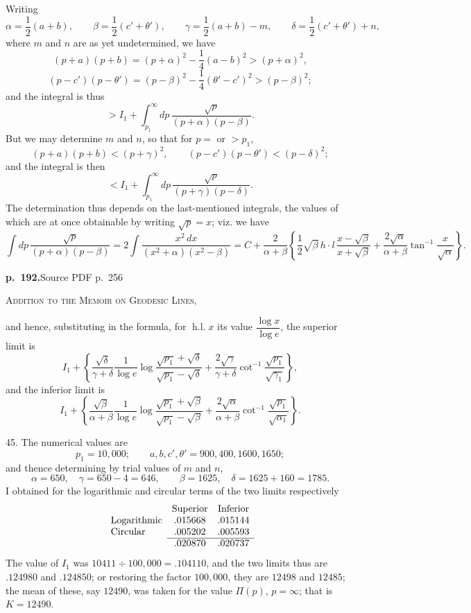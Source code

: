 \documentclass[11pt,a4paper]{article}
\newcommand{\sourcepage}[2]{\par\bigskip\noindent\textbf{p.~#1.}\hfill{\footnotesize Source PDF p.~#2}\par\nobreak\medskip}
\newcommand{\paperhead}[1]{\begin{center}\scshape #1\end{center}}
\newcommand{\hl}{\operatorname{h.l.}}
\newcommand{\cotinv}{\cot^{-1}}
\begin{document}
Writing
\[
 \alpha=\frac12(a+b),\qquad
 \beta=\frac12(c'+\theta'),\qquad
 \gamma=\frac12(a+b)-m,\qquad
 \delta=\frac12(c'+\theta')+n,
\]
where $m$ and $n$ are as yet undetermined, we have
\[
 (p+a)(p+b)=(p+\alpha)^2-\frac14(a-b)^2>(p+\alpha)^2,
\]
\[
 (p-c')(p-\theta')=(p-\beta)^2-\frac14(\theta'-c')^2>(p-\beta)^2;
\]
and the integral is thus
\[
 > I_1+\int_{p_1}^{\infty}dp\,\frac{\sqrt p}{(p+\alpha)(p-\beta)}.
\]
But we may determine $m$ and $n$, so that for $p=$ or $>p_1$,
\[
 (p+a)(p+b)<(p+\gamma)^2,\qquad
 (p-c')(p-\theta')<(p-\delta)^2;
\]
and the integral is then
\[
 < I_1+\int_{p_1}^{\infty}dp\,\frac{\sqrt p}{(p+\gamma)(p-\delta)}.
\]
The determination thus depends on the last-mentioned integrals, the values of which are at
once obtainable by writing $\sqrt p=x$; viz. we have
\[
 \int dp\,\frac{\sqrt p}{(p+\alpha)(p-\beta)}
 =2\int\frac{x^2\,dx}{(x^2+\alpha)(x^2-\beta)}
 =C+\frac{2}{\alpha+\beta}
 \left\{\frac12\sqrt\beta\,h\cdot l\,\frac{x-\sqrt\beta}{x+\sqrt\beta}
 +\frac{2\sqrt\alpha}{\alpha+\beta}\tan^{-1}\frac{x}{\sqrt\alpha}\right\}.
\]

\clearpage
\sourcepage{192}{256}
\paperhead{Addition to the Memoir on Geodesic Lines,}

and hence, substituting in the formula, for $\hl x$ its value $\dfrac{\log x}{\log e}$, the superior limit is
\[
 I_1+\left\{
 \frac{\sqrt{\delta}}{\gamma+\delta}\frac{1}{\log e}
 \log\frac{\sqrt{p_1}+\sqrt{\delta}}{\sqrt{p_1}-\sqrt{\delta}}
 +\frac{2\sqrt{\gamma}}{\gamma+\delta}\cotinv\frac{\sqrt{p_1}}{\sqrt{\gamma_1}}
 \right\},
\]
and the inferior limit is
\[
 I_1+\left\{
 \frac{\sqrt{\beta}}{\alpha+\beta}\frac{1}{\log e}
 \log\frac{\sqrt{p_1}+\sqrt{\beta}}{\sqrt{p_1}-\sqrt{\beta}}
 +\frac{2\sqrt{\alpha}}{\alpha+\beta}\cotinv\frac{\sqrt{p_1}}{\sqrt{\alpha_1}}
 \right\}.
\]

45. The numerical values are
\[
p_1=10,000;\qquad a,b,c',\theta'=900,400,1600,1650;
\]
and thence determining by trial values of $m$ and $n$,
\[
\alpha=650,\quad \gamma=650-4=646,\qquad
\beta=1625,\quad \delta=1625+160=1785.
\]
I obtained for the logarithmic and circular terms of the two limits respectively
\[
\begin{array}{lcc}
&\text{Superior}&\text{Inferior}\\
\text{Logarithmic}&.015668&.015144\\
\text{Circular}&.005202&.005593\\ \cline{2-3}
&.020870&.020737
\end{array}
\]
The value of $I_1$ was $10411\div100,000=.104110$, and the two limits thus are $.124980$ and $.124850$; or restoring the factor $100,000$, they are $12498$ and $12485$; the mean of these, say $12490$, was taken for the value $\Pi(p)$, $p=\infty$; that is $K=12490$.
\end{document}
